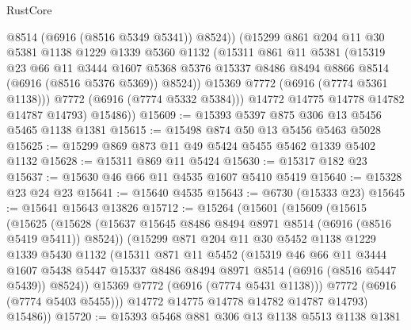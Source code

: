\begin{lexlean}{RustCore}
\begin{coremodule}
                @8514
                (@6916 (@8516 @5349 @5341))
                @8524))
            (@15299
              @861
              @204
              @11
              @30
              @5381
              @1138
              @1229
              @1339
              @5360
              @1132
              (@15311
                @861
                @11
                @5381
                (@15319
                  @23
                  @66
                  @11
                  @3444
                  @1607
                  @5368
                  @5376
                  @15337
                  @8486
                  @8494
                  @8866
                  @8514
                  (@6916 (@8516 @5376 @5369))
                  @8524))
              @15369
              @7772
              (@6916 (@7774 @5361 @1138)))
            @7772
            (@6916 (@7774 @5332 @5384)))
          @14772
          @14775
          @14778
          @14782
          @14787
          @14793)
        @15486))
@15609 := @15393 @5397 @875 @306 @13 @5456 @5465 @1138 @1381
@15615 := @15498 @874 @50 @13 @5456 @5463 @5028
@15625 := @15299 @869 @873 @11 @49 @5424 @5455 @5462 @1339 @5402 @1132
@15628 := @15311 @869 @11 @5424
@15630 := @15317 @182 @23
@15637 := @15630 @46 @66 @11 @4535 @1607 @5410 @5419
@15640 := @15328 @23 @24 @23
@15641 := @15640 @4535
@15643 := @6730 (@15333 @23)
@15645 := @15641 @15643 @13826
@15712 := @15264
    (@15601
      (@15609
        (@15615
          (@15625
            (@15628 (@15637 @15645 @8486 @8494 @8971 @8514 (@6916 (@8516 @5419 @5411)) @8524))
            (@15299
              @871
              @204
              @11
              @30
              @5452
              @1138
              @1229
              @1339
              @5430
              @1132
              (@15311
                @871
                @11
                @5452
                (@15319
                  @46
                  @66
                  @11
                  @3444
                  @1607
                  @5438
                  @5447
                  @15337
                  @8486
                  @8494
                  @8971
                  @8514
                  (@6916 (@8516 @5447 @5439))
                  @8524))
              @15369
              @7772
              (@6916 (@7774 @5431 @1138)))
            @7772
            (@6916 (@7774 @5403 @5455)))
          @14772
          @14775
          @14778
          @14782
          @14787
          @14793)
        @15486))
@15720 := @15393 @5468 @881 @306 @13 @1138 @5513 @1138 @1381

\end{coremodule}
\end{lexlean}
